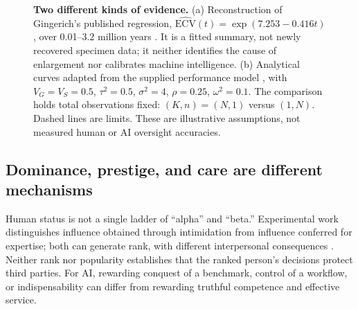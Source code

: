 \documentclass[10pt,twocolumn,letterpaper]{article}
\begin{document}
\begin{figure}[t]
\centering
{}
\caption{\textbf{Two different kinds of evidence.} (a) Reconstruction of Gingerich's published regression, $\widehat{\mathrm{ECV}}(t)=\exp(7.253-0.416t)$, over 0.01--3.2 million years \cite{gingerich}. It is a fitted summary, not newly recovered specimen data; it neither identifies the cause of enlargement nor calibrates machine intelligence. (b) Analytical curves adapted from the supplied performance model \cite{performance}, with $V_G=V_S=0.5$, $\tau^2=0.5$, $\sigma^2=4$, $\rho=0.25$, $\omega^2=0.1$. The comparison holds total observations fixed: $(K,n)=(N,1)$ versus $(1,N)$. Dashed lines are limits. These are illustrative assumptions, not measured human or AI oversight accuracies.}
\label{fig:evolution}
\end{figure}

\subsection{Dominance, prestige, and care are different mechanisms}
Human status is not a single ladder of ``alpha'' and ``beta.'' Experimental work distinguishes influence obtained through intimidation from influence conferred for expertise; both can generate rank, with different interpersonal consequences \cite{cheng}. Neither rank nor popularity establishes that the ranked person's decisions protect third parties. For AI, rewarding conquest of a benchmark, control of a workflow, or indispensability can differ from rewarding truthful competence and effective service.
\end{document}
